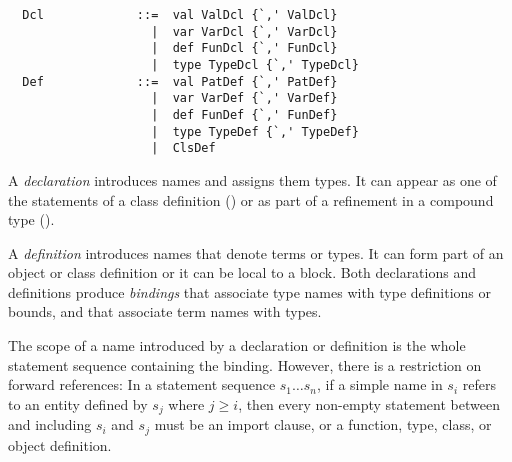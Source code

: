\documentclass[a4paper,12pt,twoside,titlepage]{book}
\begin{document}
\syntax\begin{lstlisting}
  Dcl             ::=  val ValDcl {`,' ValDcl}
                    |  var VarDcl {`,' VarDcl}
                    |  def FunDcl {`,' FunDcl}
                    |  type TypeDcl {`,' TypeDcl}
  Def             ::=  val PatDef {`,' PatDef}
                    |  var VarDef {`,' VarDef}
                    |  def FunDef {`,' FunDef}
                    |  type TypeDef {`,' TypeDef}
                    |  ClsDef
\end{lstlisting}

A {\em declaration} introduces names and assigns them types. It can
appear as one of the statements of a class definition
() or as part of a refinement in a compound
type ().

A {\em definition} introduces names that denote terms or types. It can
form part of an object or class definition or it can be local to a
block.  Both declarations and definitions produce {\em bindings} that
associate type names with type definitions or bounds, and that
associate term names with types.

The scope of a name introduced by a declaration or definition is the
whole statement sequence containing the binding.  However, there is a
restriction on forward references: In a statement sequence $s_1 \ldots
s_n$, if a simple name in $s_i$ refers to an entity defined by $s_j$
where $j \geq i$, then every non-empty statement between and including
$s_i$ and $s_j$ must be an import clause,
or a function, type, class, or object definition.

\end{document}
